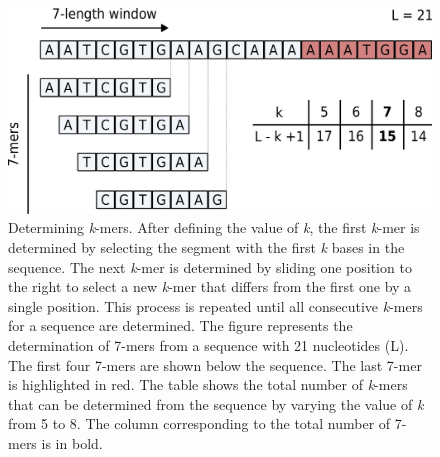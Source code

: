 \begin{figure}[h!]
    \centering
    \includegraphics[angle=0,width=\textwidth]{figures/introduction/Figure10.pdf}
    \caption[Determining \textit{k}-mers]{Determining \textit{k}-mers. After defining the value of \textit{k}, the first \textit{k}-mer is determined by selecting the segment with the first \textit{k} bases in the sequence. The next \textit{k}-mer is determined by sliding one position to the right to select a new \textit{k}-mer that differs from the first one by a single position. This process is repeated until all consecutive \textit{k}-mers for a sequence are determined. The figure represents the determination of 7-mers from a sequence with 21 nucleotides (L). The first four 7-mers are shown below the sequence. The last 7-mer is highlighted in red. The table shows the total number of \textit{k}-mers that can be determined from the sequence by varying the value of \textit{k} from 5 to 8. The column corresponding to the total number of 7-mers is in bold.}
    \label{fig:introduction_figure10}
\end{figure}

